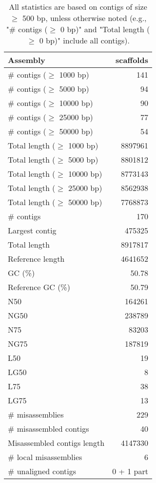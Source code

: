 \documentclass[12pt,a4paper]{article}
\begin{document}
\begin{table}[ht]
\begin{center}
\caption{All statistics are based on contigs of size $\geq$ 500 bp, unless otherwise noted (e.g., "\# contigs ($\geq$ 0 bp)" and "Total length ($\geq$ 0 bp)" include all contigs).}
\begin{tabular}{|l*{1}{|r}|}
\hline
Assembly & scaffolds \\ \hline
\# contigs ($\geq$ 1000 bp) & 141 \\ \hline
\# contigs ($\geq$ 5000 bp) & 94 \\ \hline
\# contigs ($\geq$ 10000 bp) & 90 \\ \hline
\# contigs ($\geq$ 25000 bp) & 77 \\ \hline
\# contigs ($\geq$ 50000 bp) & 54 \\ \hline
Total length ($\geq$ 1000 bp) & 8897961 \\ \hline
Total length ($\geq$ 5000 bp) & 8801812 \\ \hline
Total length ($\geq$ 10000 bp) & 8773143 \\ \hline
Total length ($\geq$ 25000 bp) & 8562938 \\ \hline
Total length ($\geq$ 50000 bp) & 7768873 \\ \hline
\# contigs & 170 \\ \hline
Largest contig & 475325 \\ \hline
Total length & 8917817 \\ \hline
Reference length & 4641652 \\ \hline
GC (\%) & 50.78 \\ \hline
Reference GC (\%) & 50.79 \\ \hline
N50 & 164261 \\ \hline
NG50 & 238789 \\ \hline
N75 & 83203 \\ \hline
NG75 & 187819 \\ \hline
L50 & 19 \\ \hline
LG50 & 8 \\ \hline
L75 & 38 \\ \hline
LG75 & 13 \\ \hline
\# misassemblies & 229 \\ \hline
\# misassembled contigs & 40 \\ \hline
Misassembled contigs length & 4147330 \\ \hline
\# local misassemblies & 6 \\ \hline
\# unaligned contigs & 0 + 1 part \\ \hline

\end{tabular}
\end{center}
\end{table}
\end{document}
